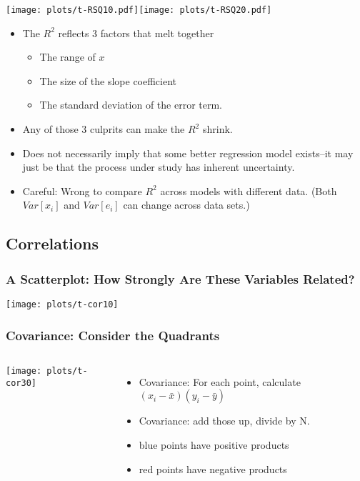 \documentclass[10pt,english]{beamer}
\def\lyxframeend{} %
\newenvironment{topcolumns}{\begin{columns}[t]}{\end{columns}}
\begin{document}
\texttt{[image: plots/t-RSQ10.pdf]}\texttt{[image: plots/t-RSQ20.pdf]}


\lyxframeend{}
\begin{itemize}
\item The $R^{2}$ reflects 3 factors that melt together

\begin{itemize}
\item The range of $x$
\item The size of the slope coefficient
\item The standard deviation of the error term.
\end{itemize}
\item Any of those 3 culprits can make the $R^{2}$ shrink.
\item Does not necessarily imply that some better regression model exists--it
may just be that the process under study has inherent uncertainty. 
\item Careful: Wrong to compare $R^{2}$ across models with different data.
(Both $Var[x_{i}]$ and $Var[e_{i}]$ can change across data sets.)
\end{itemize}

\lyxframeend{}


\lyxframeend{}\subsection{Correlations}

\begin{frame}[containsverbatim]
\frametitle{A Scatterplot: How Strongly Are These Variables Related?}


\texttt{[image: plots/t-cor10]}

\end{frame}

\begin{frame}[containsverbatim]
\frametitle{Covariance: Consider the Quadrants}

\begin{topcolumns}%


\column{6cm}


\texttt{[image: plots/t-cor30]}


\column{6cm}
\begin{itemize}
\item Covariance: For each point, calculate $(x_{i}-\bar{x})(y_{i}-\bar{y})$
\item Covariance: add those up, divide by N.
\item blue points have positive products
\item red points have negative products
\end{itemize}
\end{topcolumns}%
\end{frame}
\end{document}
